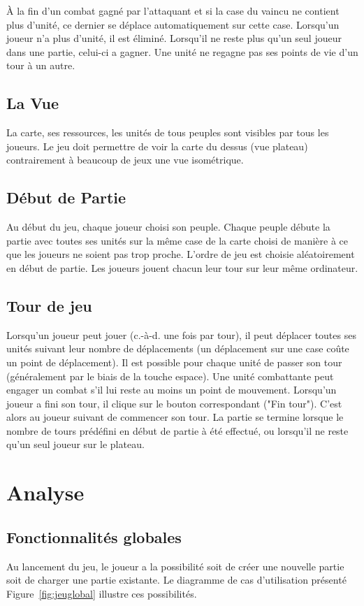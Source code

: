 \documentclass[a4paper]{article}%
\begin{document}
À la fin d’un combat gagné par l’attaquant et si la case du vaincu ne contient plus d’unité, ce dernier se déplace automatiquement sur cette case. Lorsqu’un joueur n’a plus d’unité, il est éliminé. Lorsqu’il ne reste plus qu’un seul joueur dans une partie, celui-ci a gagner. Une unité ne regagne pas ses points de vie d’un tour à un autre.

\subsection{La Vue}
La carte, ses ressources, les unités de tous peuples sont visibles par tous les joueurs. Le jeu doit permettre de voir la carte du dessus (vue plateau) contrairement à beaucoup de jeux  
une vue isométrique.

\subsection{Début de Partie}
Au début du jeu, chaque joueur choisi son peuple. Chaque peuple débute la partie avec toutes ses unités sur la même case de la carte choisi de manière à ce que les joueurs ne soient pas trop proche. L’ordre de jeu est choisie aléatoirement en début de partie. Les joueurs jouent chacun leur tour sur leur même ordinateur.

\subsection{Tour de jeu}
\label{tourdejeu}
Lorsqu’un joueur peut jouer (c.-à-d. une fois par tour), il peut déplacer toutes ses unités suivant leur nombre de déplacements (un déplacement sur une case coûte un point de déplacement). Il est possible pour chaque unité de passer son tour (généralement par le biais de la touche espace). Une unité combattante peut engager un combat s’il lui reste au moins un point de mouvement. Lorsqu’un joueur a fini son tour, il clique sur le bouton correspondant ("Fin tour"). C’est alors au joueur suivant de commencer son tour. La partie se termine lorsque le nombre de tours prédéfini en début de partie à été effectué, ou lorsqu’il ne reste qu’un seul joueur sur le plateau.


\section{Analyse}
\label{debut}
\subsection{Fonctionnalités globales}
Au lancement du jeu, le joueur a la possibilité soit de créer une nouvelle partie soit de charger une partie existante. Le diagramme de cas d'utilisation présenté Figure~\ref{fig:jeuglobal} illustre ces possibilités.
\end{document}

